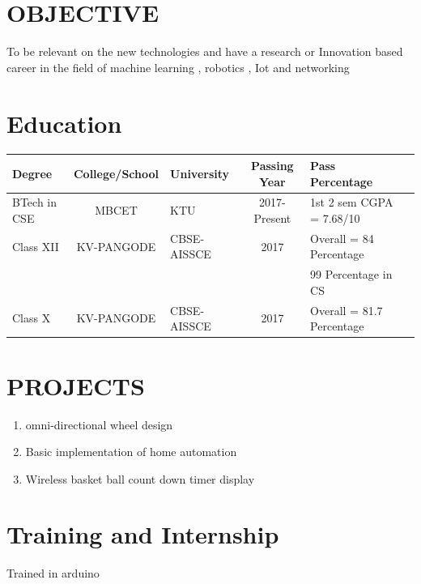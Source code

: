\documentclass[margin,line]{res}
\begin{document}
\begin{resume}
\vspace{.1in}
\section{\sc OBJECTIVE}

To be relevant on the new technologies and have a research or Innovation based career in the field of machine learning , robotics , Iot and networking
\vspace{.1in}
\section{\sc Education}
\begin{tabular}{|l|c|l|c|l|c|}\hline
	\bf Degree&\bf College/School&\bf University&\bf Passing Year&\bf Pass Percentage \\ \hline
	BTech in CSE
	&MBCET & KTU & 2017-Present&1st 2 sem CGPA = 7.68/10 \\ \hline
	Class XII
	&KV-PANGODE & CBSE-AISSCE  & 2017& Overall = 84 Percentage \\&&&&99 Percentage in CS 
	
	\\ \hline
	Class X
	&KV-PANGODE & CBSE-AISSCE  & 2017& Overall = 81.7 Percentage 
	
	\\ \hline
\end{tabular}
\section{\sc PROJECTS}

\begin{enumerate} %
	\item omni-directional wheel design \\
	\item Basic implementation of home automation\\
	\item Wireless basket ball count down timer display\\
\end{enumerate}

\section{\sc Training and Internship}
Trained in arduino \\

\end{resume}
\end{document}
